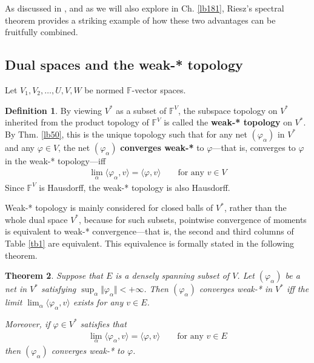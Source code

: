 \documentclass[12pt,b5paper,notitlepage]{article}
\theoremstyle{definition}
\newtheorem{df}{Definition}[subsection]
\theoremstyle{plain}
\newtheorem{thm}[df]{Theorem}
\newcommand{\bk}[1]{\langle {#1}\rangle}
\newcommand{\Fbb}{\mathbb F}
\numberwithin{equation}{section}
\begin{document}
As discussed in \cite[Sec. 25.8, 25.9]{Gui-A}, and as we will also explore in Ch. \ref{lb181}, Riesz’s spectral theorem provides a striking example of how these two advantages can be fruitfully combined.



\subsection{Dual spaces and the weak-* topology}\label{lb522}


Let $V_1,V_2,\dots,U,V,W$ be normed $\Fbb$-vector spaces.


\begin{df}
By viewing $V^*$ as a subset of $\Fbb^V$, the subspace topology on $V^*$ inherited from the product topology of $\Fbb^V$ is called the \textbf{weak-* topology}  on $V^*$. By Thm. \ref{lb50}, this is the unique topology such that for any net $(\varphi_\alpha)$ in $V^*$ and any $\varphi\in V$, the net $(\varphi_\alpha)$ \textbf{converges weak-*}  to $\varphi$---that is, converges to $\varphi$ in the weak-* topology---iff 
\begin{align}\label{eq49}
\lim_\alpha\bk{\varphi_\alpha,v}=\bk{\varphi,v}\qquad\text{for any }v\in V
\end{align}
Since $\Fbb^V$ is Hausdorff, the weak-* topology is also Hausdorff.
\end{df}



Weak-* topology is mainly considered for closed balls of $V^*$, rather than the whole dual space $V^*$, because for such subsets, pointwise convergence of moments is equivalent to weak-* convergence---that is, the second and third columns of Table \ref{tb1} are equivalent. This equivalence is formally stated in the following theorem.

\begin{thm}\label{lb80}
Suppose that $E$ is a densely spanning subset of $V$. Let $(\varphi_\alpha)$ be a net in $V^*$ satisfying $\sup_\alpha\Vert\varphi_\alpha\Vert<+\infty$. Then $(\varphi_\alpha)$ converges weak-* in $V^*$ iff the limit $\lim_\alpha\bk{\varphi_\alpha,v}$ exists for any $v\in E$. 

Moreover, if  $\varphi\in V^*$ satisfies that
\begin{align*}
\lim_\alpha\bk{\varphi_\alpha,v}=\bk{\varphi,v}\qquad\text{for any }v\in E
\end{align*}
then $(\varphi_\alpha)$ converges weak-* to $\varphi$.
\end{thm}
\end{document}
